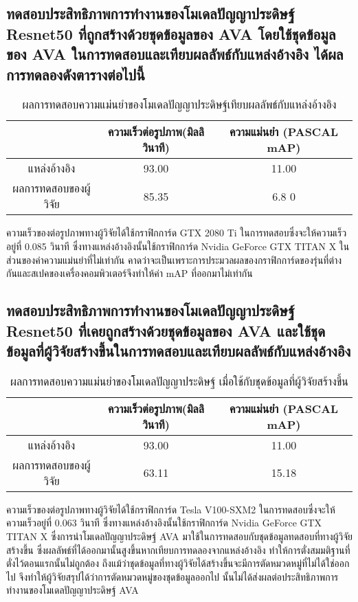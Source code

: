 \subsection{ทดสอบประสิทธิภาพการทำงานของโมเดลปัญญาประดิษฐ์ Resnet50 ที่ถูกสร้างด้วยชุดข้อมูลของ AVA โดยใช้ชุดข้อมูลของ AVA ในการทดสอบและเทียบผลลัพธ์กับแหล่งอ้างอิง ได้ผลการทดลองดังตารางต่อไปนี้}
\begin{table}[!ht]
	\centering
	\begin{tabular}{|c|c|c|}
			\hline
			{}&{ความเร็วต่อรูปภาพ(มิลลิวินาที)}&{ความแม่นยำ (PASCAL mAP)}			\\
			\hline
			แหล่งอ้างอิง	 					& 93.00		& 11.00				\\
			ผลการทดสอบของผู้วิจัย				& 85.35  		& 6.8	0				\\
			\hline
	\end{tabular}
\caption{ผลการทดสอบความแม่นยำของโมเดลปัญญาประดิษฐ์เทียบผลลัพธ์กับแหล่งอ้างอิง}
\label{tab: Compare PASCAL mAP with source}
\end{table}
ความเร็วของต่อรูปภาพทางผู้วิจัยได้ใช้กราฟิกการ์ด GTX 2080 Ti ในการทดสอบซึ่งจะให้ความเร็วอยู่ที่ 0.085 วินาที ซึ่งทางแหล่งอ้างอิงนั้นใช้กราฟิกการ์ด Nvidia GeForce GTX TITAN X 
ในส่วนของค่าความแม่นยำที่ไม่เท่ากัน คาดว่าจะเป็นเพราะการประมวลผลของกราฟิกการ์ดของรุ่นที่ต่างกันและสเปคของเครื่องคอมพิวเตอร์จึงทำให้ค่า mAP ที่ออกมาไม่เท่ากัน

\subsection{ทดสอบประสิทธิภาพการทำงานของโมเดลปัญญาประดิษฐ์ Resnet50 ที่เคยถูกสร้างด้วยชุดข้อมูลของ AVA และใช้ชุดข้อมูลที่ผู้วิจัยสร้างขึ้นในการทดสอบและเทียบผลลัพธ์กับแหล่งอ้างอิง}
\begin{table}[!ht]
	\centering
	\begin{tabular}{|c|c|c|}
			\hline
			{}&{ความเร็วต่อรูปภาพ(มิลลิวินาที)}&{ความแม่นยำ (PASCAL mAP)}			\\
			\hline
			แหล่งอ้างอิง	 					& 93.00			& 11.00			\\
			ผลการทดสอบของผู้วิจัย				& 63.11			& 15.18			\\
			\hline
	\end{tabular}
\caption{ผลการทดสอบความแม่นยำของโมเดลปัญญาประดิษฐ์ เมื่อใช้กับชุดข้อมูลที่ผู้วิจัยสร้างขึ้น}
\label{tab: Compare PASCAL mAP with dataset created by the researcher}
\end{table}
ความเร็วของต่อรูปภาพทางผู้วิจัยได้ใช้กราฟิกการ์ด Tesla V100-SXM2 ในการทดสอบซึ่งจะให้ความเร็วอยู่ที่ 0.063 วินาที ซึ่งทางแหล่งอ้างอิงนั้นใช้กราฟิกการ์ด Nvidia GeForce GTX TITAN X ซึ่งการนำโมเดลปัญญาประดิษฐ์ AVA มาใช้ในการทดสอบกับชุดข้อมูลทดสอบที่ทางผู้วิจัยสร้างขึ้น ซึ่งผลลัพธ์ที่ได้ออกมานั้นสูงขึ้นหากเทียบการทดลองจากแหล่งอ้างอิง ทำให้การตั่งสมมติฐานที่ตั่งไว้ตอนแรกนั้นไม่ถูกต้อง ถึงแม้ว่าชุดข้อมูลที่ทางผู้วิจัยได้สร้างขึ้นจะมีการตัดหมวดหมู่ที่ไม่ได้ใช่ออกไป จึงทำให้ผู้วิจัยสรุปได้ว่าการตัดหมวดหมู่ของชุดข้อมูลออกไป นั้นไม่ได้ส่งผลต่อประสิทธิภาพการทำงานของโมเดลปัญญาประดิษฐ์ AVA


